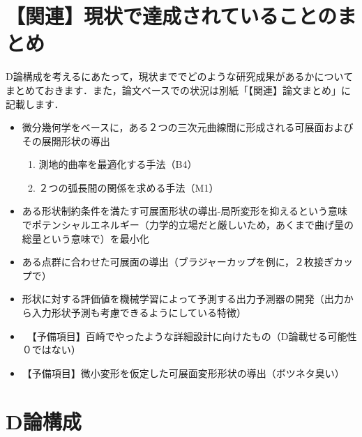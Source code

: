 \documentclass[16pt]{jsarticle}
\begin{document}
	\section{【関連】現状で達成されていることのまとめ}
		D論構成を考えるにあたって，現状まででどのような研究成果があるかについてまとめておきます．また，論文ベースでの状況は別紙「【関連】論文まとめ」に記載します．
		\begin{itemize}
			\item 微分幾何学をベースに，ある２つの三次元曲線間に形成される可展面およびその展開形状の導出
				\begin{enumerate}
					\item 測地的曲率を最適化する手法（B4）
					\item ２つの弧長間の関係を求める手法（M1）
				\end{enumerate}
			\item ある形状制約条件を満たす可展面形状の導出-局所変形を抑えるという意味でポテンシャルエネルギー（力学的立場だと厳しいため，あくまで曲げ量の総量という意味で）を最小化
			\item ある点群に合わせた可展面の導出（ブラジャーカップを例に，２枚接ぎカップで）
			\item 形状に対する評価値を機械学習によって予測する出力予測器の開発（出力から入力形状予測も考慮できるようにしている特徴）
			\item　【予備項目】百崎でやったような詳細設計に向けたもの（D論載せる可能性０ではない）
			\item 【予備項目】微小変形を仮定した可展面変形形状の導出（ボツネタ臭い）
		\end{itemize}
	\section{D論構成}
\end{document}
